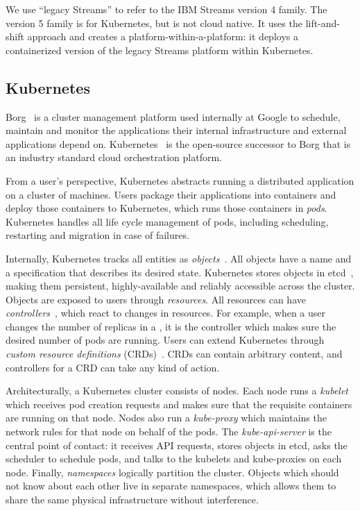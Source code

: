We use ``legacy Streams'' to refer to the IBM Streams version 4 family. The
version 5 family is for Kubernetes, but is not cloud native. It uses the
lift-and-shift approach and creates a platform-within-a-platform: it deploys a
containerized version of the legacy Streams platform within Kubernetes.

\subsection{Kubernetes}

Borg~\cite{borg-2015} is a cluster management platform used internally at Google
to schedule, maintain and monitor the applications their internal infrastructure
and external applications depend on. Kubernetes~\cite{kube} is the open-source
successor to Borg that is an industry standard cloud orchestration platform.

From a user's perspective, Kubernetes abstracts running a distributed
application on a cluster of machines. Users package their applications into
containers and deploy those containers to Kubernetes, which runs those
containers in \emph{pods}. Kubernetes handles all life cycle management of pods,
including scheduling, restarting and migration in case of failures.

Internally, Kubernetes tracks all entities as \emph{objects}~\cite{kubeobjects}.
All objects have a name and a specification that describes its desired state.
Kubernetes stores objects in etcd~\cite{etcd}, making them persistent,
highly-available and reliably accessible across the cluster. Objects are exposed
to users through \emph{resources}. All resources can have
\emph{controllers}~\cite{kubecontrollers}, which react to changes in resources.
For example, when a user changes the number of replicas in a
, it is the  controller which makes sure the
desired number of pods are running. Users can extend Kubernetes through
\emph{custom resource definitions} (CRDs)~\cite{kubecrd}. CRDs can contain
arbitrary content, and controllers for a CRD can take any kind of action.

Architecturally, a Kubernetes cluster consists of nodes. Each node runs a
\emph{kubelet} which receives pod creation requests and makes sure that the
requisite containers are running on that node. Nodes also run a
\emph{kube-proxy} which maintains the network rules for that node on behalf of
the pods. The \emph{kube-api-server} is the central point of contact: it
receives API requests, stores objects in etcd, asks the scheduler to schedule
pods, and talks to the kubelets and kube-proxies on each node. Finally,
\emph{namespaces} logically partition the cluster. Objects which should not know
about each other live in separate namespaces, which allows them to share the
same physical infrastructure without interference.


